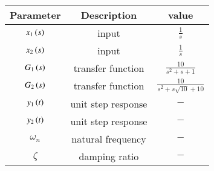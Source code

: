 \begin{tabular}{|c|c|c|}
	\hline
	\textbf{Parameter} &  \textbf{Description} & \textbf{value}\\[6pt]
	\hline
	$x_{1}\left(s\right)$ & input & $\frac{1}{s}$ \\[6pt]
	\hline
	$x_{2}\left(s\right)$ & input & $\frac{1}{s}$ \\[6pt]
	\hline
	$G_{1}\left(s\right)$ & transfer function & $\frac{10}{s^{2} + s + 1} $ \\[6pt]
	\hline
	$G_{2}\left(s\right)$ & transfer function & $\frac{10}{s^{2}+s\sqrt{10} +10} $ \\[6pt]
	\hline
	$y_{1}\left(t\right)$ & unit step response & $-$\\[6pt]
	\hline
	$y_{2}\left(t\right)$ & unit step response & $-$\\[6pt]
	\hline
	$\omega_{n}$ & natural frequency & $-$\\[6pt]
	\hline
	$\zeta$ & damping ratio & $-$\\[6pt]
	\hline 
	
\end{tabular}
